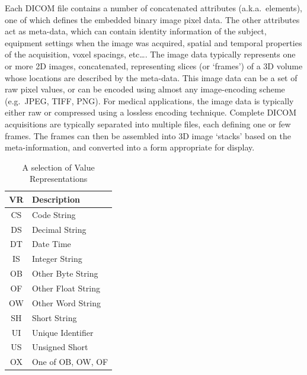 Each DICOM file contains a number of concatenated attributes (a.k.a.~elements), one of which defines the embedded binary image pixel data.  The other attributes act as meta-data, which can contain identity information of the subject, equipment settings when the image was acquired, spatial and temporal properties of the acquisition, voxel spacings, etc\ldots.  The image data typically represents one or more 2D images, concatenated, representing slices (or `frames') of a 3D volume whose locations are described by
the meta-data.  This image data can be a set of raw pixel values, or can be encoded using almost any image-encoding scheme (e.g.~JPEG, TIFF, PNG).  For medical applications, the image data is typically either raw or compressed using a lossless encoding technique.  Complete DICOM acquisitions are typically separated into multiple files, each defining one or few frames.  The frames can then be assembled into 3D image `stacks' based on the meta-information, and converted into a form appropriate for display.

\begin{table}[ht]
   \centering
   \caption{A selection of Value Representations \label{tbl:dicom:vr}}
   \smallskip
   \begin{tabular}{|cl|}
      \hline
      VR & Description\\
      \hline
      CS & Code String \\ 
      DS & Decimal String \\ 
      DT & Date Time \\ 
      IS & Integer String \\ 
      OB & Other Byte String \\ 
      OF & Other Float String \\ 
      OW & Other Word String \\ 
      SH & Short String \\
      UI & Unique Identifier \\ 
      US & Unsigned Short \\ 
      OX & One of OB, OW, OF\\
      \hline
   \end{tabular}
\end{table}

